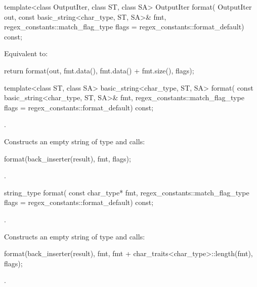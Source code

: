 %
\begin{itemdecl}
template<class OutputIter, class ST, class SA>
  OutputIter format(
    OutputIter out,
    const basic_string<char_type, ST, SA>& fmt,
    regex_constants::match_flag_type flags = regex_constants::format_default) const;
\end{itemdecl}

\begin{itemdescr}
\pnum
\effects
Equivalent to:
\begin{codeblock}
return format(out, fmt.data(), fmt.data() + fmt.size(), flags);
\end{codeblock}
\end{itemdescr}

%
\begin{itemdecl}
template<class ST, class SA>
  basic_string<char_type, ST, SA> format(
    const basic_string<char_type, ST, SA>& fmt,
    regex_constants::match_flag_type flags = regex_constants::format_default) const;
\end{itemdecl}

\begin{itemdescr}
\pnum
\expects
{}.

\pnum
\effects
Constructs an empty string  of type  and
calls:
\begin{codeblock}
format(back_inserter(result), fmt, flags);
\end{codeblock}

\pnum
\returns
{}.
\end{itemdescr}

%
\begin{itemdecl}
string_type format(
  const char_type* fmt,
  regex_constants::match_flag_type flags = regex_constants::format_default) const;
\end{itemdecl}

\begin{itemdescr}
\pnum
\expects
{}.

\pnum
\effects
Constructs an empty string  of type  and
calls:
\begin{codeblock}
format(back_inserter(result), fmt, fmt + char_traits<char_type>::length(fmt), flags);
\end{codeblock}

\pnum
\returns
{}.
\end{itemdescr}

